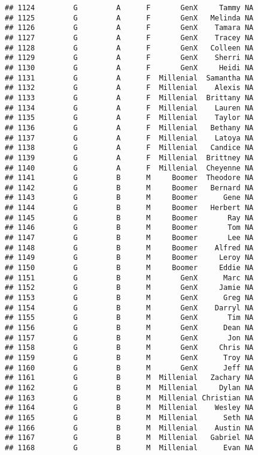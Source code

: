 \documentclass[
]{article}
\begin{document}
\begin{verbatim}
## 1124         G         A      F       GenX     Tammy NA
## 1125         G         A      F       GenX   Melinda NA
## 1126         G         A      F       GenX    Tamara NA
## 1127         G         A      F       GenX    Tracey NA
## 1128         G         A      F       GenX   Colleen NA
## 1129         G         A      F       GenX    Sherri NA
## 1130         G         A      F       GenX     Heidi NA
## 1131         G         A      F  Millenial  Samantha NA
## 1132         G         A      F  Millenial    Alexis NA
## 1133         G         A      F  Millenial  Brittany NA
## 1134         G         A      F  Millenial    Lauren NA
## 1135         G         A      F  Millenial    Taylor NA
## 1136         G         A      F  Millenial   Bethany NA
## 1137         G         A      F  Millenial    Latoya NA
## 1138         G         A      F  Millenial   Candice NA
## 1139         G         A      F  Millenial  Brittney NA
## 1140         G         A      F  Millenial  Cheyenne NA
## 1141         G         B      M     Boomer  Theodore NA
## 1142         G         B      M     Boomer   Bernard NA
## 1143         G         B      M     Boomer      Gene NA
## 1144         G         B      M     Boomer   Herbert NA
## 1145         G         B      M     Boomer       Ray NA
## 1146         G         B      M     Boomer       Tom NA
## 1147         G         B      M     Boomer       Lee NA
## 1148         G         B      M     Boomer    Alfred NA
## 1149         G         B      M     Boomer     Leroy NA
## 1150         G         B      M     Boomer     Eddie NA
## 1151         G         B      M       GenX      Marc NA
## 1152         G         B      M       GenX     Jamie NA
## 1153         G         B      M       GenX      Greg NA
## 1154         G         B      M       GenX    Darryl NA
## 1155         G         B      M       GenX       Tim NA
## 1156         G         B      M       GenX      Dean NA
## 1157         G         B      M       GenX       Jon NA
## 1158         G         B      M       GenX     Chris NA
## 1159         G         B      M       GenX      Troy NA
## 1160         G         B      M       GenX      Jeff NA
## 1161         G         B      M  Millenial   Zachary NA
## 1162         G         B      M  Millenial     Dylan NA
## 1163         G         B      M  Millenial Christian NA
## 1164         G         B      M  Millenial    Wesley NA
## 1165         G         B      M  Millenial      Seth NA
## 1166         G         B      M  Millenial    Austin NA
## 1167         G         B      M  Millenial   Gabriel NA
## 1168         G         B      M  Millenial      Evan NA

\end{verbatim}
\end{document}

